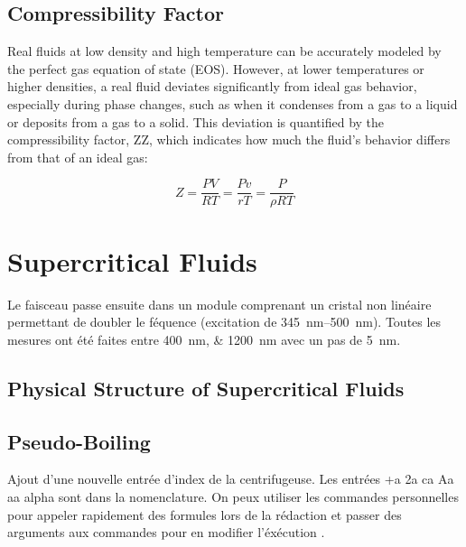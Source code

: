 	\subsection{Compressibility Factor}

	Real fluids at low density and high temperature can be accurately modeled by the perfect gas 
	equation of state (EOS). However, at lower temperatures or higher densities, a real fluid 
	deviates significantly from ideal gas behavior, especially during phase changes, such as when 
	it condenses from a gas to a liquid or deposits from a gas to a solid. This deviation is 
	quantified by the compressibility factor, ZZ, which indicates how much the fluid's behavior
	differs from that of an ideal gas:

	\begin{equation}
		Z = \frac{PV}{RT} =\frac{Pv}{rT} = \frac{P}{\rho RT} 
	\end{equation}

\section{Supercritical Fluids}

	Le faisceau passe ensuite dans un module comprenant un cristal non linéaire permettant de doubler le féquence (excitation de \SIrange{345}{500}{\nano\meter}). Toutes les mesures ont été faites entre \SIlist{400;1200}{\nano\meter} avec un pas de \SI{5}{\nano\meter}.
	
	\lipsum[3]

	\subsection{Physical Structure of Supercritical Fluids}

		\lipsum[4]

	\subsection{Pseudo-Boiling} %

		Ajout d'une nouvelle entrée d'index de la centrifugeuse. Les entrées \gls{+a} \gls{2a} \gls{ca} \gls{Aa} \gls{aa} \gls{alpha} {\NoAutoSpaceBeforeFDP}sont dans la nomenclature. On peux utiliser les commandes personnelles pour appeler rapidement des formules lors de la rédaction \acc et passer des arguments aux commandes pour en modifier l'éxécution \emiss[\nu]{\Omega}.
		
